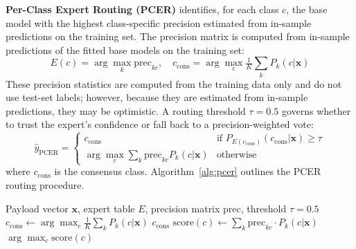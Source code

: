 \documentclass[11pt,a4paper]{article}
\begin{document}
\textbf{Per-Class Expert Routing (PCER)} identifies, for each class $c$, the
base model with the highest class-specific precision estimated from in-sample predictions on the training set. The precision matrix is computed from in-sample
predictions of the fitted base models on the training set:
\begin{equation}
  E(c) = \arg\max_k \text{prec}_{kc}, \quad
  c_{\text{cons}} = \arg\max_c \tfrac{1}{K}\textstyle\sum_k P_k(c|\mathbf{x})
  \label{eq:pcer_expert}
\end{equation}
These precision statistics are computed from the training data only and do not use test-set labels; however, because they are estimated from in-sample predictions, they may be optimistic.
A routing threshold $\tau=0.5$ governs whether to trust the expert's confidence or fall back to a
precision-weighted vote:
\begin{equation}
  \hat{y}_{\text{PCER}} =
  \begin{cases}
    c_{\text{cons}} & \text{if } P_{E(c_{\text{cons}})}(c_{\text{cons}}|\mathbf{x}) \geq \tau \\
    \arg\max_c \sum_k \text{prec}_{kc} P_k(c|\mathbf{x}) & \text{otherwise}
  \end{cases}
  \label{eq:pcer_pred}
\end{equation}
where $c_{\text{cons}}$ is the consensus class. Algorithm~\ref{alg:pcer} outlines the PCER routing procedure.

\begin{algorithm}[ht]
\caption{PCER Routing}
\label{alg:pcer}
\begin{algorithmic}[1]
\REQUIRE Payload vector $\mathbf{x}$, expert table $E$, precision matrix $\text{prec}$, threshold $\tau{=}0.5$
\STATE $c_{\text{cons}} \leftarrow \arg\max_c \frac{1}{K}\sum_k P_k(c|\mathbf{x})$
  \RETURN $c_{\text{cons}}$
\ELSE
  \STATE $\text{score}(c) \leftarrow \sum_k \text{prec}_{kc} \cdot P_k(c|\mathbf{x})$
  \RETURN $\arg\max_c \text{score}(c)$
\ENDIF
\end{algorithmic}
\end{algorithm}
\end{document}
